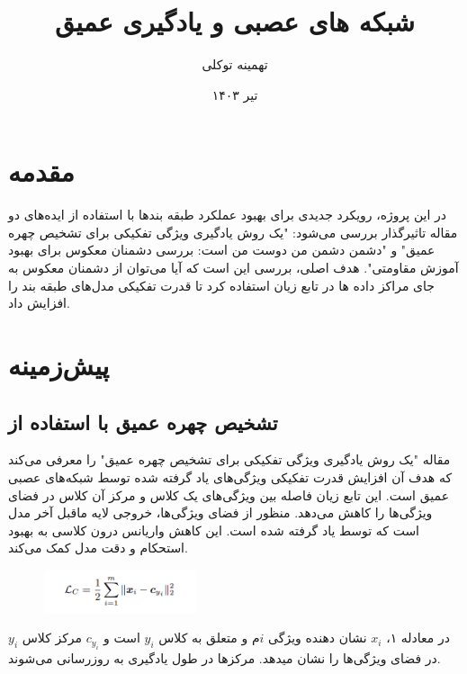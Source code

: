 \documentclass{article}
\title{ شبکه های عصبی و یادگیری عمیق}
\author{تهمینه توکلی}
\date{تیر ۱۴۰۳}
\begin{document}
\maketitle

\section{مقدمه}
در این پروژه، رویکرد جدیدی برای بهبود عملکرد طبقه بندها با استفاده از ایده‌های دو مقاله تاثیرگذار بررسی می‌شود: "یک روش یادگیری ویژگی تفکیکی برای تشخیص چهره عمیق" و "دشمن دشمن من دوست من است: بررسی دشمنان معکوس برای بهبود آموزش مقاومتی". هدف اصلی، بررسی این است که آیا می‌توان از دشمنان معکوس به جای مراکز داده ها در تابع زیان استفاده کرد تا قدرت تفکیکی مدل‌های طبقه بند را افزایش داد.

\section{پیش‌زمینه}
\subsection{تشخیص چهره عمیق با استفاده از }
مقاله "یک روش یادگیری ویژگی تفکیکی برای تشخیص چهره عمیق"  را معرفی می‌کند که هدف آن افزایش قدرت تفکیکی ویژگی‌های یاد گرفته شده توسط شبکه‌های عصبی عمیق است. این تابع زیان فاصله بین ویژگی‌های یک کلاس و مرکز آن کلاس  در فضای ویژگی‌ها را کاهش می‌دهد. منظور از فضای ویژگی‌ها، خروجی لایه ماقبل آخر مدل است که توسط
یاد گرفته شده است. این کاهش واریانس درون کلاسی به بهبود استحکام و دقت مدل کمک می‌کند.

\begin{figure}[h]
    \centering
    \includegraphics[width=0.4\textwidth]{cl-formula.png}
    \label{fig:sample_figure}
\end{figure}

در معادله ۱،
$x_i$
نشان دهنده ویژگی $i$م و متعلق به کلاس
$y_i$
است
و
$c_{y_i}$
مرکز کلاس
$y_i$
در فضای ویژگی‌ها را نشان میدهد. مرکزها در طول یادگیری به روزرسانی می‌شوند.
\end{document}
